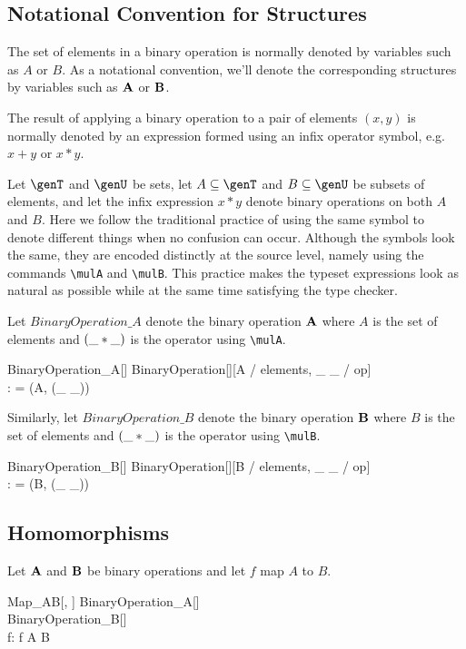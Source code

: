 \documentclass{amsart}
\begin{document}
\subsection{Notational Convention for Structures}

The set of elements in a binary operation is normally denoted by variables such as $A$ or $B$.
As a notational convention, we'll denote the corresponding structures by variables such as $\mathbf{A}$ or $\mathbf{B}$.

The result of applying a binary operation to a pair of elements $(x, y)$ 
is normally denoted by an expression formed using an infix operator symbol,
e.g. $x + y$ or $x * y$.

Let $\genT$ and $\genU$ be sets, 
let $A \subseteq \genT$ and $B \subseteq \genU$ be subsets of elements,
and let the infix expression $x * y$ denote binary operations on both $A$ and $B$.
Here we follow the traditional practice of using the same symbol to denote different things when no confusion can occur.
Although the symbols look the same, they are encoded distinctly at the source level,
namely using the commands \verb|\mulA| and \verb|\mulB|.
This practice makes the typeset expressions look as natural as possible while at the same time satisfying the type checker.

Let $BinaryOperation\_A$ denote the binary operation $\mathbf{A}$ where $A$ is the set of elements and 
$(\_  \mathbin{*} \_)$ is the operator using \verb|\mulA|.
\begin{schema}{BinaryOperation\_A}[\genT]
	BinaryOperation[\genT][A / elements, \_ \mulA \_ / op] \\
	\strucA: \binop \genT
\where
	\strucA = (A, (\_ \mulA \_))
\end{schema}

Similarly, let $BinaryOperation\_B$ denote the binary operation $\mathbf{B}$ where $B$ is the set of elements and 
$(\_ \mathbin{*} \_)$ is the operator using \verb|\mulB|.
\begin{schema}{BinaryOperation\_B}[\genU]
	BinaryOperation[\genU][B / elements, \_ \mulB \_ / op] \\
	\strucB: \binop \genU
\where
	\strucB = (B, (\_ \mulB \_))
\end{schema}

\subsection{Homomorphisms}

Let $\mathbf{A}$ and $\mathbf{B}$ be binary operations and let $f$ map $A$ to $B$.
\begin{schema}{Map\_AB}[\genT, \genU]
	BinaryOperation\_A[\genT] \\
	BinaryOperation\_B[\genU] \\
	f: \genT \pfun \genU
\where
	f \in A \fun B
\end{schema}
\end{document}
